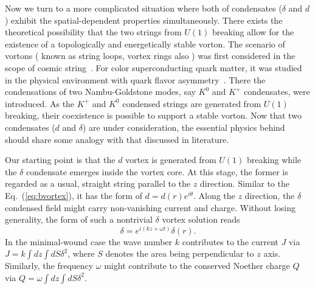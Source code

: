 \documentclass[12pt]{article}
\begin{document}
Now we turn to a more complicated situation where both of condensates ($\delta$ and $d$ ) exhibit the
spatial-dependent properties simultaneously.
There exists the theoretical possibility that the two strings from $U(1)$ breaking allow for the existence of
a topologically and energetically stable vorton. The scenario of vortons ( known as string loops, vortex rings also )
was first considered in the scope of cosmic string~\cite{vilenkin2000cosmic,witten1985superconducting,davis1988physics1,davis1988physics2,haws1988superconducting}.
For color superconducting quark matter, it was studied in the physical environment with quark flavor asymmetry~\cite{kaplan2002charged,buckley2002superconducting}. There the condensations of two Nambu-Goldstone
modes, say $K^0$ and $K^+$ condensates, were introduced. As the $K^+$ and $K^0$ condensed strings are generated
from $U(1)$ breaking, their coexistence is possible to support a stable vorton.
Now that two condensates ($d$ and $\delta$) are under consideration,
the essential physics behind should share some analogy with that discussed in literature.

Our starting point is that the $d$ vortex is generated from $U(1)$ breaking while the $\delta$ condensate emerges
inside the vortex core. At this stage, the former is regarded as a usual, straight string parallel to the
$z$ direction. Similar to the Eq.~(\ref{eq:bvortex}), it has the form of $d = d(r)e^{i\theta}$.
Along the $z$ direction, the $\delta$ condensed field might carry non-vanishing current and charge.
Without losing generality, the form of such a nontrivial $\delta$ vortex solution reads
\begin{equation}
  \label{eq:delta}
  \delta =  e^{i(kz+\omega t)}\delta(r).
\end{equation}
In the minimal-wound case the wave number $k$ contributes to the current $J$ via
$J =k\int dz \int dS \delta^2$, where $S$ denotes the area being perpendicular to $z$ axis.
Similarly, the frequency $\omega$ might contribute to the conserved
Noether charge $Q$ via $Q = \omega\int dz \int dS \delta^2$.
\end{document}
